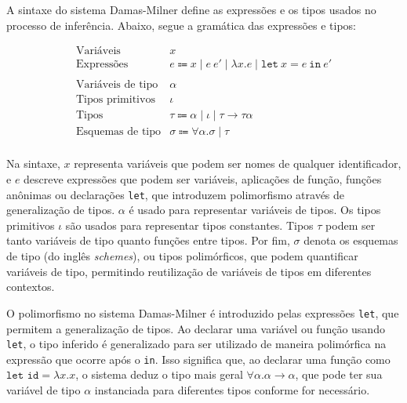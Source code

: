 A sintaxe do sistema Damas-Milner define as expressões e os tipos usados no processo de inferência.
Abaixo, segue a gramática das expressões e tipos:

\begin{equation}\label{eq:dm-syntax}\nonumber
  \begin{array}{ll}
    \text{Variáveis}         & x                                                                                 \\
    \text{Expressões}        & e \Coloneqq x \mid e \ e' \mid \lambda x.e \mid \texttt{let} \ x = e \ \texttt{in} \ e' \\
    \\
    \text{Variáveis de tipo} & \alpha                                                                            \\
    \text{Tipos primitivos}  & \iota                                                                             \\
    \text{Tipos}             & \tau \Coloneqq \alpha \mid \iota \mid \tau \rightarrow \tau
    \alpha                                                                                                       \\
    \text{Esquemas de tipo}           & \sigma \Coloneqq \forall \alpha. \sigma \mid \tau                                       \\
  \end{array}
\end{equation}

Na sintaxe, $x$ representa variáveis que podem ser nomes de qualquer identificador, e $e$ descreve expressões que podem ser variáveis, aplicações de função, funções anônimas ou declarações \texttt{let}, que introduzem polimorfismo através de generalização de tipos.
$\alpha$ é usado para representar variáveis de tipos.
Os tipos primitivos $\iota$ são usados para representar tipos constantes.
Tipos $\tau$ podem ser tanto variáveis de tipo quanto funções entre tipos.
Por fim, $\sigma$ denota os esquemas de tipo (do inglês \textit{schemes}), ou tipos polimórficos, que podem quantificar variáveis de tipo, permitindo reutilização de variáveis de tipos em diferentes contextos.

O polimorfismo no sistema Damas-Milner é introduzido pelas expressões \texttt{let}, que permitem a generalização de tipos.
Ao declarar uma variável ou função usando \texttt{let}, o tipo inferido é generalizado para ser utilizado de maneira polimórfica na expressão que ocorre após o \texttt{in}.
Isso significa que, ao declarar uma função como $\texttt{let id} = \lambda x.x$, o sistema deduz o tipo mais geral $\forall \alpha. \alpha \rightarrow \alpha$, que pode ter sua variável de tipo $\alpha$ instanciada para diferentes tipos conforme for necessário.

